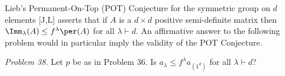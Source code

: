 Lieb's Permanent-On-Top (POT) Conjecture for the symmetric group on $d$ elements [J,L] asserts that if $A$ is a $d\times d$ positive semi-definite matrix then $\Imm_\lambda(A)\le f^\lambda\per(A)$ for all $\lambda\vdash d$.  An affirmative answer to the following problem would in particular imply the validity of the POT Conjecture.

\emph{Problem 38.}  Let $p$ be as in Problem 36.  Is $a_\lambda\le f^\lambda a_{(1^d)}$ for all $\lambda\vdash d$?
